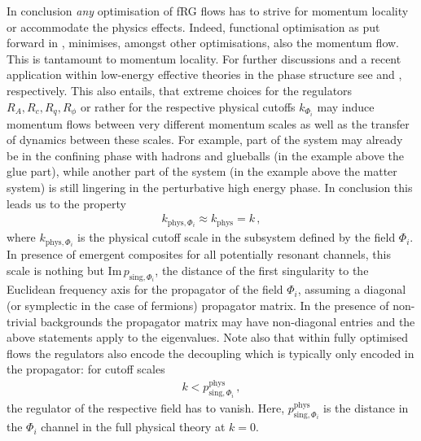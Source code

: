 \documentclass[aps,twocolumn,prd,superscriptaddress]{revtex4-2}
\begin{document}
In conclusion \textit{any} optimisation of fRG flows has to strive for momentum locality or accommodate the physics effects. Indeed, functional optimisation as put forward in \cite{Pawlowski:2005xe}, minimises, amongst other optimisations, also the momentum flow. This is tantamount to momentum locality. For further discussions and a recent application within low-energy effective theories in the phase structure see \cite{Pawlowski:2015mlf} and \cite{Ihssen:2023xlp}, respectively. This also entails, that extreme choices for the regulators $R_A,R_c,R_q,R_\phi$ or rather for the respective physical cutoffs $k_{\Phi_i}$ may induce momentum flows between very different momentum scales as well as the transfer of dynamics between these scales. For example, part of the system may already be in the confining phase with hadrons and glueballs (in the example above the glue part), while another part of the system (in the example above the matter system) is still lingering in the perturbative high energy phase. In conclusion this leads us to the property 
%
\begin{align} 
	k_{\textrm{phys},\Phi_i} \approx k_\textrm{phys}=k\,, 
	\label{eq:Identicalks}
\end{align}
% 
where $k_{\textrm{phys},\Phi_i}$ is the physical cutoff scale in the subsystem defined by the field $\Phi_i$. In presence of emergent composites for all potentially resonant channels, this scale is nothing but $\textrm{Im}\, p_{\textrm{sing},\Phi_i}$, the distance of the first singularity to the Euclidean frequency axis for the propagator of the field $\Phi_i$, assuming a diagonal (or symplectic in the case of fermions) propagator matrix. In the presence of non-trivial backgrounds the propagator matrix may have non-diagonal entries and the above statements apply to the eigenvalues. Note also that within fully optimised flows the regulators also encode the decoupling which is typically only encoded in the propagator: for cutoff scales 
%
\begin{align}
k< p^{\textrm{phys}}_{\textrm{sing},\Phi_i}\,,
\end{align}
% 
the regulator of the respective field has to vanish. Here, $p^{\textrm{phys}}_{\textrm{sing},\Phi_i}$ is the distance in the $\Phi_i$ channel in the full physical theory at $k=0$. 
\end{document}
